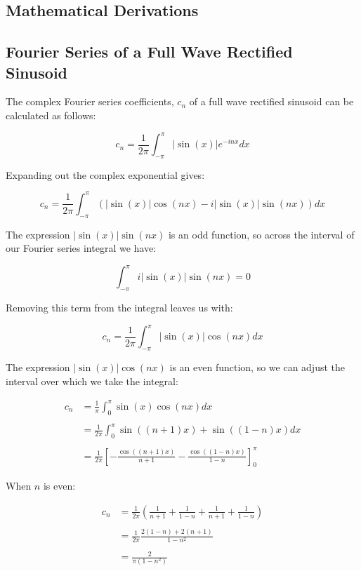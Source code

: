 \begin{appendices}
\chapter{Mathematical Derivations}
\label{app:MathematicalDerivations}
	\section{Fourier Series of a Full Wave Rectified Sinusoid}
	\label{app:MathematicalDerivations-Rectification}
		The complex Fourier series coefficients, $c_{n}$ of a full wave rectified sinusoid can be calculated as
		follows:

		\[ c_{n} = \frac{1}{2\pi} \int_{-\pi}^{\pi} |\sin(x)|e^{-inx} dx \]

		Expanding out the complex exponential gives:

		\[ c_{n} = \frac{1}{2\pi} \int_{-\pi}^{\pi} \left( |\sin(x)|\cos(nx) - i|\sin(x)|\sin(nx) \right) dx \]

		The expression $|\sin(x)|\sin(nx)$ is an odd function, so across the interval of our Fourier series integral
		we have:

		\[ \int_{-\pi}^{\pi} i|\sin(x)|\sin(nx) = 0 \]

		Removing this term from the integral leaves us with:

		\[ c_{n} = \frac{1}{2\pi} \int_{-\pi}^{\pi} |\sin(x)|\cos(nx) dx \]

		The expression $|\sin(x)|\cos(nx)$ is an even function, so we can adjust the interval over which we take the
		integral:

		\begin{align}
			c_{n} & = \frac{1}{\pi} \int_{0}^{\pi} \sin(x)\cos(nx) dx \nonumber \\
			\nonumber \\
			& = \frac{1}{2\pi} \int_{0}^{\pi} \sin((n+1)x) + \sin((1-n)x) dx \nonumber \\
			\nonumber \\
			& = \frac{1}{2\pi} \left[ -\frac{\cos((n+1)x)}{n+1} - 
				\frac{\cos((1-n)x)}{1-n} \right]_{0}^{\pi} \nonumber
		\end{align}

		When $n$ is even:

		\begin{align}
			c_{n} & = \frac{1}{2\pi} \left( \frac{1}{n+1} + \frac{1}{1-n} 
				+ \frac{1}{n+1} + \frac{1}{1-n} \right) \nonumber \\
			\nonumber \\
			& = \frac{1}{2\pi} \frac{2(1-n) + 2(n+1)}{1 - n^{2}} \nonumber \\
			\nonumber \\
			& = \frac{2}{\pi(1 - n^{2})} \nonumber
		\end{align}


\end{appendices}
